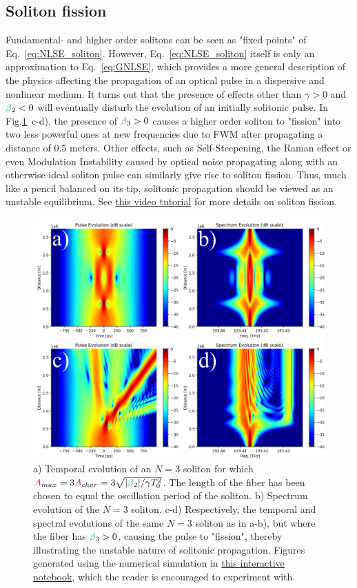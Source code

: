 \subsection{Soliton fission}
\label{subsec:fission}
Fundamental- and higher order solitons can be seen as "fixed points" of Eq.~\ref{eq:NLSE_soliton}. However, Eq.~\ref{eq:NLSE_soliton} itself is only an approximation to Eq.~\ref{eq:GNLSE}, which provides a more general description of the physics affecting the propagation of an optical pulse in a dispersive and nonlinear medium. It turns out that the presence of effects other than $\gamma>0$ and $\betag_2<0$ will eventually disturb the evolution of an initially solitonic pulse. In Fig.\ref{fig:Soliton_comparison}~c-d), the presence of $\betag_3>0$ causes a higher order soliton to "fission" into two less powerful ones at new frequencies due to FWM after propagating a distance of 0.5 meters. Other effects, such as Self-Steepening, the Raman effect or even Modulation Instability caused by optical noise propagating along with an otherwise ideal soliton pulse can similarly give rise to soliton fission. Thus, much like a pencil balanced on its tip, solitonic propagation should be viewed as an unstable equilibrium. See \href{https://youtu.be/tHpIR2Kuxp0}{this video tutorial} for more details on soliton fission.
\begin{figure}
    \centering
    \includegraphics[width=1\linewidth]{figures/Soliton_comparison.png}
    \caption{a) Temporal evolution of an $N=3$ soliton for which $\A_{max}=3\A_{char}=3\sqrt{|\betag_2|/\gamma T_0^2}$. The length of the fiber has been chosen to equal the oscillation period of the soliton. b) Spectrum evolution of the $N=3$ soliton. c-d) Respectively, the temporal and spectral evolutions of the same $N=3$ soliton as in a-b), but where the fiber has $\betag_3>0$, causing the pulse to "fission", thereby illustrating the unstable nature of solitonic propagation. Figures generated using the numerical simulation in \href{https://colab.research.google.com/drive/123pT-IsLWIEZY9XW3-1WzkTXfg1IEkkD?usp=sharing}{this interactive notebook}, which the reader is encouraged to experiment with.}
    \label{fig:Soliton_comparison}
\end{figure}
